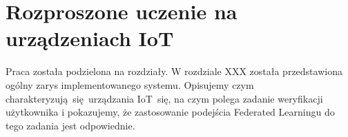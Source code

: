 %
%


\newpage
\section[general]{Rozproszone uczenie na urządzeniach IoT}


Praca została podzielona na rozdziały. W rozdziale XXX została przedstawiona ogólny zarys implementowanego systemu. Opisujemy czym charakteryzują się urządzania IoT się, na czym polega zadanie weryfikacji użytkownika i pokazujemy, że zastosowanie podejścia Federated Learningu do tego zadania jest odpowiednie.
